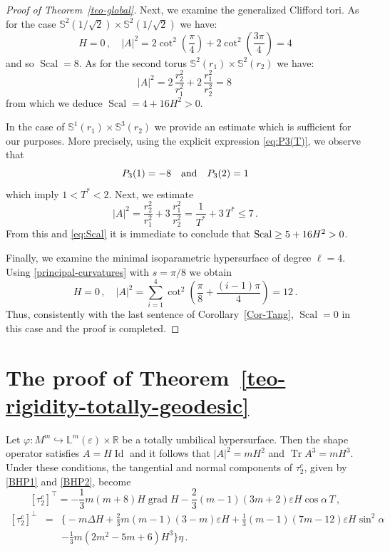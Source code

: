 \documentclass[11pt,leqno]{amsart}
\theoremstyle{plain}
\theoremstyle{definition}
\numberwithin{equation}{section}
\def \s{{\mathbb S}}
\newcommand{\Id}{\operatorname{Id}}
\newcommand{\Scal}{\operatorname{Scal}}
\DeclareMathOperator{\grad}{grad}
\DeclareMathOperator{\trace}{Tr}
\numberwithin{equation}{section}
\begin{document}
{\begin{proof}[Proof of Theorem~\ref{teo-global}]
Next, we examine the generalized Clifford tori. As for the case $\s^2(1/\sqrt 2)\times \s^2(1/\sqrt 2)$ we have:
\[
H=0\,,\quad |A|^2=2 \cot^2 \left( \frac{\pi}{4}\right )+2 \cot^2 \left( \frac{3\pi}{4}\right )=4
\]
and so $\Scal=8$. As for the second torus $\s^2(r_1)\times \s^2(r_2)$ we have: 
\[
|A|^2=2 \,\frac{r_2^2}{r_1^2}+2\, \frac{r_1^2}{r_2^2}=8\,
\]
from which we deduce $\Scal=4+16 H^2 >0$.

In the case of $\s^1(r_1)\times \s^3(r_2)$ we provide an estimate which is sufficient for our purposes. More precisely, using the explicit expression \eqref{eq:P3(T)}, we observe that
\[
P_3(1)=-8 \quad {\rm and}\quad P_3(2)=1
\]
which imply $1<T^*<2$. Next, we estimate 
\[
|A|^2=\frac{r_2^2}{r_1^2}+3\, \frac{r_1^2}{r_2^2}=\frac{1}{T^{*}}+3\,T^{*} \leq 7\,.
\]
From this and \eqref{eq:Scal} it is immediate to conclude that ${\rm Scal}\geq 5+16 H^2 >0$.

Finally, we examine the minimal isoparametric hypersurface of degree $\ell=4$. Using \eqref{principal-curvatures} with $s=\pi/8$ we obtain
\[
H=0\,, \quad |A|^2= \sum_{i=1}^4 \cot^2 \left( \frac{\pi}{8} +\frac{(i-1)\pi}{4} \right )=12\,.
\]
Thus, consistently with the last sentence of Corollary~\ref{Cor-Tang}, $\Scal=0$ in this case and the proof is completed.
\end{proof} 

 
  \section{The proof of Theorem~\ref{teo-rigidity-totally-geodesic}}
Let $\varphi:M^{m}\hookrightarrow {\mathbb L}^m(\varepsilon)\times \mathbb{R}$  be a totally umbilical hypersurface. Then the shape operator satisfies $A=H \Id$ and it follows that $|A|^2=m H^2$ and $\trace A^3=m H^3$. Under these conditions, the tangential and normal components of $\tau_2^c$, given by \eqref{BHP1} and \eqref{BHP2}, become
\begin{equation}\label{eq-cbh-product-umbilical-tangent}
\left[\tau_2^c\right]^{\top}=-\frac{1}{3} m\left(m+8\right) H \grad H-\frac{2}{3}(m-1)(3m+2) \varepsilon H \cos\alpha\, T\,,
\end{equation}
\begin{eqnarray}\label{eq-cbh-product-umbilical-normal}
\left[\tau_2^c\right]^{\perp} &=&\big\{-m \Delta H+\frac{2}{3} m(m-1)(3-m)\varepsilon H+\frac{1}{3}  (m-1)(7 m-12) \varepsilon H\sin^2 \alpha\nonumber\\
&&-\frac{1}{3} m\left(2m^2-5m+6\right) H^3\big\}\eta\,.
\end{eqnarray}

}
\end{document}
